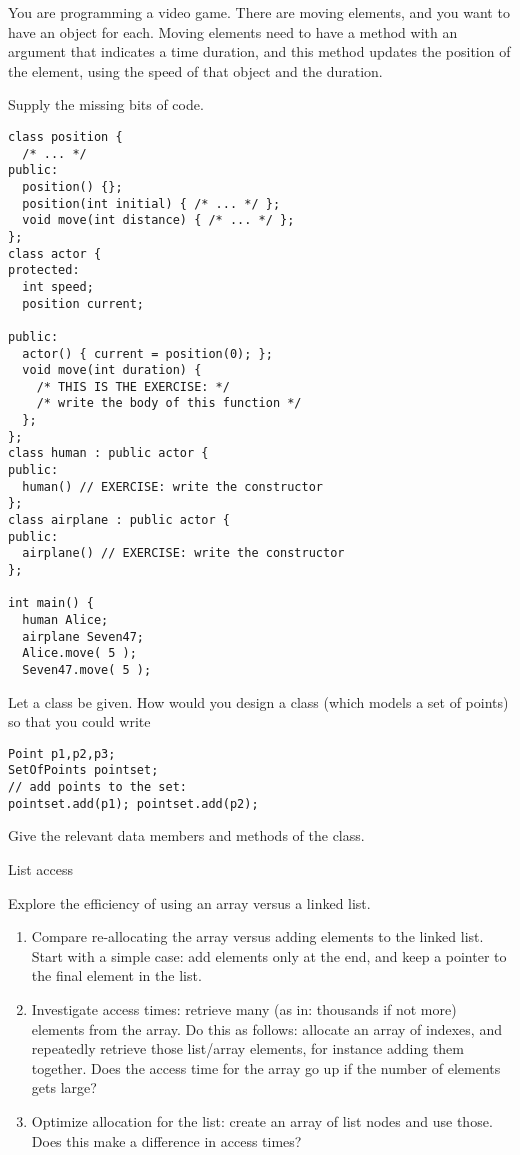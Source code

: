 \begin{exercise}
  You are programming a video game. There are moving elements, and you
  want to have an object for each. Moving elements need to have a
  method  with an argument that indicates a time duration, and
  this method updates the position of the element, using the speed of
  that object and the duration.

  Supply the missing bits of code.
\begin{verbatim}
class position {
  /* ... */
public:
  position() {};
  position(int initial) { /* ... */ };
  void move(int distance) { /* ... */ };
};
class actor {
protected:
  int speed;
  position current;

public:
  actor() { current = position(0); };
  void move(int duration) {
    /* THIS IS THE EXERCISE: */
    /* write the body of this function */
  };
};
class human : public actor {
public:
  human() // EXERCISE: write the constructor
};
class airplane : public actor {
public:
  airplane() // EXERCISE: write the constructor
};

int main() {
  human Alice;
  airplane Seven47;
  Alice.move( 5 );
  Seven47.move( 5 );
\end{verbatim}
\end{exercise}

\begin{exercise}
  \label{ex:pointset-add}
  Let a  class be given. 
  How would you design a class  (which models a set of
  points) so that you could write
\begin{verbatim}
Point p1,p2,p3;
SetOfPoints pointset;
// add points to the set:
pointset.add(p1); pointset.add(p2);
\end{verbatim}
 Give the relevant data members and methods of the class.
\end{exercise}



 {List access}

\begin{exercise}
  Explore the efficiency of using an array versus a linked list.
  \begin{enumerate}
  \item Compare re-allocating the array versus adding elements to the
    linked list. Start with a simple case: add elements only at the
    end, and keep a pointer to the final element in the list.
  \item Investigate access times: retrieve many (as in: thousands if
    not more) elements from the array. Do this as follows: allocate an
    array of indexes, and repeatedly retrieve those list/array
    elements, for instance adding them together. Does the access time
    for the array go up if the number of elements gets large?
  \item Optimize allocation for the list: create an array of list
    nodes and use those. Does this make a difference in access times?
  \end{enumerate}
\end{exercise}
